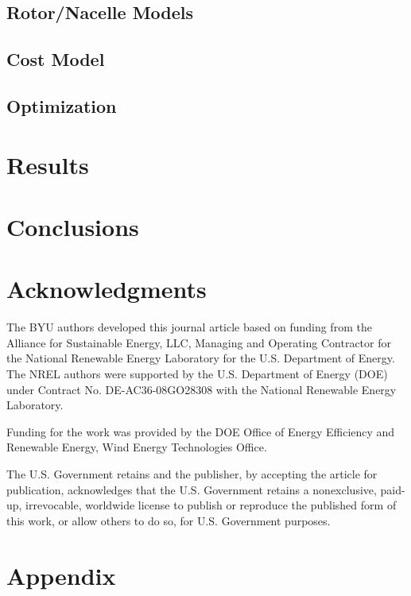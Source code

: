 \documentclass[]{aiaa-tc}
\begin{document}
\subsection{Rotor/Nacelle Models}


\subsection{Cost Model}


\subsection{Optimization}

        
        
\section{Results}



\section{Conclusions}



\section*{Acknowledgments}
The BYU authors developed this journal article based on funding from the Alliance for Sustainable Energy, LLC, Managing and Operating Contractor for the National Renewable Energy Laboratory for the U.S. Department of Energy.  The NREL authors were supported by the U.S. Department of Energy (DOE) under Contract No. DE-AC36-08GO28308 with the National Renewable Energy Laboratory.

Funding for the work was provided by the DOE Office of Energy Efficiency and Renewable Energy, Wind Energy Technologies Office.

The U.S. Government retains and the publisher, by accepting the article for publication, acknowledges that the U.S. Government retains a nonexclusive, paid-up, irrevocable, worldwide license to publish or reproduce the published form of this work, or allow others to do so, for U.S. Government purposes.





\section*{Appendix}

\end{document}
